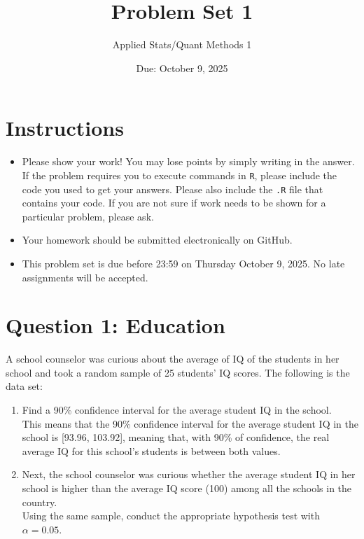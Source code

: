 \documentclass[12pt,letterpaper]{article}
\title{Problem Set 1}
\date{Due: October 9, 2025}
\author{Applied Stats/Quant Methods 1}
\begin{document}
	\maketitle
	
	\section*{Instructions}
	\begin{itemize}
	\item Please show your work! You may lose points by simply writing in the answer. If the problem requires you to execute commands in \texttt{R}, please include the code you used to get your answers. Please also include the \texttt{.R} file that contains your code. If you are not sure if work needs to be shown for a particular problem, please ask.
\item Your homework should be submitted electronically on GitHub.
\item This problem set is due before 23:59 on Thursday October 9, 2025. No late assignments will be accepted.
	\end{itemize}
	
	\vspace{1cm}
	\section*{Question 1: Education}

A school counselor was curious about the average of IQ of the students in her school and took a random sample of 25 students' IQ scores. The following is the data set:\\
\vspace{.5cm}

  

\vspace{1cm}

\begin{enumerate}
	\item Find a 90\% confidence interval for the average student IQ in the school.\\
	
	 
	
	This means that the 90\% confidence interval for the average student IQ in the school is [93.96, 103.92], meaning that, with 90\% of confidence, the real average IQ for this school's students is between both values.
	
	\item Next, the school counselor was curious  whether  the average student IQ in her school is higher than the average IQ score (100) among all the schools in the country.\\ 
	
	
	\noindent Using the same sample, conduct the appropriate hypothesis test with $\alpha=0.05$.
\end{enumerate}
\end{document}
